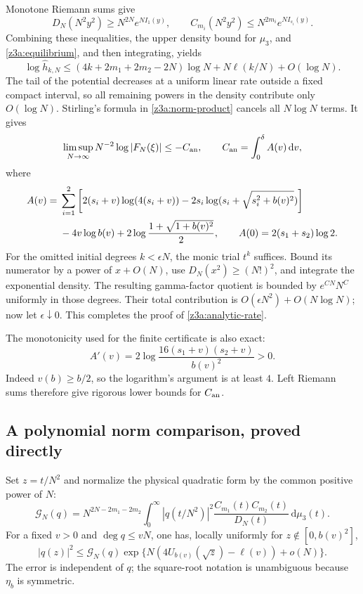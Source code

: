 \documentclass[11pt]{article}
\theoremstyle{definition}\newtheorem{definition}[theorem]{Definition}
\theoremstyle{remark}\newtheorem{remark}[theorem]{Remark}
\begin{document}
Monotone Riemann sums give
\[
 D_N(N^2y^2)\ge N^{2N}e^{NI_1(y)},\qquad
 C_{m_i}(N^2y^2)\le N^{2m_i}e^{NI_{s_i}(y)}.
\]
Combining these inequalities, the upper density bound for $\mu_3$, and
\eqref{z3a:equilibrium}, and then integrating, yields
\[
 \log\widehat h_{k,N}
 \le(4k+2m_1+2m_2-2N)\log N+N\ell(k/N)+O(\log N).
\]
The tail of the potential decreases at a uniform linear rate outside a
fixed compact interval, so all remaining powers in the density contribute
only $O(\log N)$.  Stirling's formula in \eqref{z3a:norm-product} cancels
all $N\log N$ terms.  It gives
\begin{equation}\label{z3a:analytic-rate}
 \limsup_{N\to\infty}N^{-2}\log|F_N(\xi)|\le-C_{\rm an},
 \qquad C_{\rm an}=\int_0^\delta A(v)\,\mathrm dv,
\end{equation}
where
\begin{align}
 A(v)={}&\sum_{i=1}^2\left[
  2(s_i+v)\log(4(s_i+v))
  -2s_i\log(s_i+\sqrt{s_i^2+b(v)^2})\right]\notag\\
 &-4v\log b(v)+2\log\frac{1+\sqrt{1+b(v)^2}}2,
 \qquad A(0)=2(s_1+s_2)\log2.\label{z3a:A}
\end{align}
For the omitted initial degrees $k<\epsilon N$, the monic trial $t^k$
suffices.  Bound its numerator by a power of $x+O(N)$, use
$D_N(x^2)\ge(N!)^2$, and integrate the exponential density.  The resulting
gamma-factor quotient is bounded by $e^{CN}N^C$ uniformly in those degrees.
Their total contribution is $O(\epsilon N^2)+O(N\log N)$; now let
$\epsilon\downarrow0$.  This completes the proof of
\eqref{z3a:analytic-rate}.

The monotonicity used for the finite certificate is also exact:
\[
 A'(v)=2\log\frac{16(s_1+v)(s_2+v)}{b(v)^2}>0.
\]
Indeed $v(b)\ge b/2$, so the logarithm's argument is at least $4$.
Left Riemann sums therefore give rigorous lower bounds for $C_{\rm an}$.

\subsection{A polynomial norm comparison, proved directly}

Set $z=t/N^2$ and normalize the physical quadratic form by the common
positive power of $N$:
\[
 \mathcal G_N(q)=N^{2N-2m_1-2m_2}
 \int_0^\infty |q(t/N^2)|^2
        \frac{C_{m_1}(t)C_{m_2}(t)}{D_N(t)}\,\mathrm d\mu_3(t).
\]
For a fixed $v>0$ and $\deg q\le vN$, one has, locally uniformly for
$z\notin[0,b(v)^2]$,
\begin{equation}\label{z3a:pointwise-norm}
 |q(z)|^2\le \mathcal G_N(q)
  \exp\{N(4U_{b(v)}(\sqrt z)-\ell(v))+o(N)\}.
\end{equation}
The error is independent of $q$; the square-root notation is unambiguous
because $\eta_b$ is symmetric.
\end{document}
